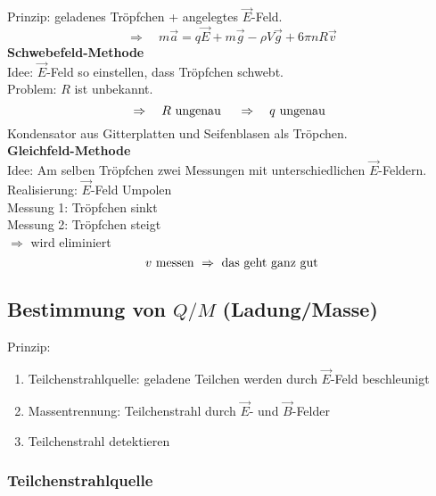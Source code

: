 Prinzip: geladenes Tröpfchen + angelegtes $ \vec{E} $-Feld.
\begin{equation*}
\Rightarrow \quad m \vec{a} = q \vec{E} + m \vec{g} - \rho V \vec{g} + 6 \pi n R \vec{v}
\end{equation*}
\textbf{Schwebefeld-Methode}\\
Idee: $ \vec{E} $-Feld so einstellen, dass Tröpfchen schwebt.\\
Problem: $ R $ ist unbekannt.
\begin{equation*}
\Rightarrow \quad R \textrm{ ungenau } \quad \Rightarrow \quad q \textrm{ ungenau }
\end{equation*}
Kondensator aus Gitterplatten und Seifenblasen als Tröpchen.\\[5pt]
\textbf{Gleichfeld-Methode}\\
Idee: Am selben Tröpfchen zwei Messungen mit unterschiedlichen $ \vec{E} $-Feldern.\\
Realisierung: $ \vec{E} $-Feld Umpolen\\[5pt]
Messung 1: Tröpfchen sinkt\\
Messung 2: Tröpfchen steigt\\
$ \Rightarrow $ wird eliminiert
\begin{equation*}
v \textrm{ messen } \Rightarrow \textrm{ das geht ganz gut}
\end{equation*}

\subsection{Bestimmung von \texorpdfstring{$ Q / M $}{Q/M} (Ladung/Masse)}

Prinzip:
\begin{enumerate}[1)]
	\item Teilchenstrahlquelle: geladene Teilchen werden durch $ \vec{E} $-Feld beschleunigt
	\item Massentrennung: Teilchenstrahl durch $ \vec{E} $- und $ \vec{B} $-Felder
	\item Teilchenstrahl detektieren
\end{enumerate}

\subsubsection{Teilchenstrahlquelle}

